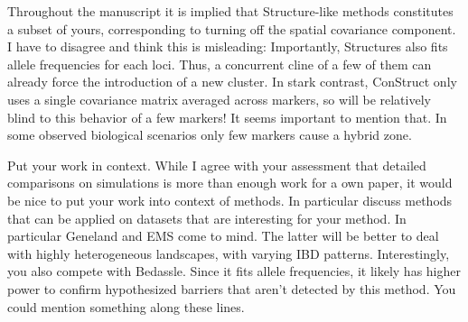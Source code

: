 \begin{point}{}
    Throughout the manuscript it is implied that Structure-like methods constitutes a subset of yours, 
 corresponding to turning off the spatial covariance component. 
 I have to disagree and think this is misleading: 
 Importantly, Structures also fits allele frequencies for each loci. 
 Thus, a concurrent cline of a few of them can already force the introduction of a new cluster. 
 In stark contrast, ConStruct only uses a single covariance matrix averaged across markers, 
 so will be relatively blind to this behavior of a few markers! 
 It seems important to mention that. 
 In some observed biological scenarios only few markers cause a hybrid zone.
\end{point}


\begin{point}{}
    Put your work in context. 
 While I agree with your assessment that detailed comparisons on simulations is more than enough work for a own paper, 
 it would be nice to put your work into context of methods. 
 In particular discuss methods that can be applied on datasets that are interesting for your method. 
 In particular Geneland and EMS come to mind. 
 The latter will be better to deal with highly heterogeneous landscapes, with varying IBD patterns.
Interestingly, you also compete with Bedassle. 
Since it fits allele frequencies, it likely has higher power to confirm 
hypothesized barriers that aren't detected by this method. 
You could mention something along these lines.
\end{point}


